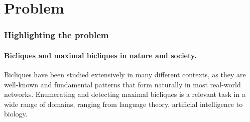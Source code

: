 \documentclass[table]{report}
\begin{document}
%
%
%
%
%
%
%
%
%
%
%
%
%
%




\chapter{Problem}
\minitoc
\subsection{Highlighting the problem}


\subsubsection{Bicliques and maximal bicliques in nature and society.}
Bicliques have been studied extensively in many different contexts, as they are well-known and fundamental patterns that form naturally in most real-world networks. Enumerating and detecting maximal bicliques is a relevant task in a wide range of domains, ranging from language theory, artificial intelligence to biology.
\end{document}
